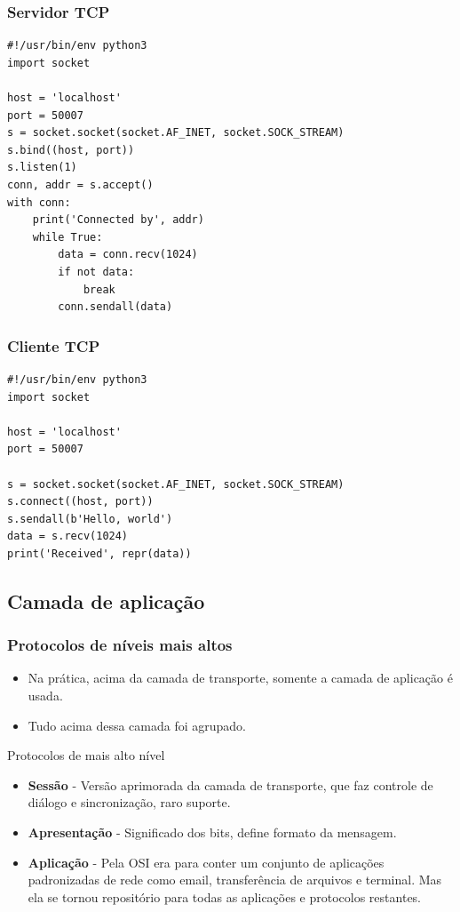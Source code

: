 \documentclass[xcolor=dvipsnames,10pt,compress,aspectratio=169]{beamer}
\begin{document}
\begin{frame}[fragile]
  \frametitle{Servidor TCP}
\begin{lstlisting}
#!/usr/bin/env python3
import socket

host = 'localhost'
port = 50007
s = socket.socket(socket.AF_INET, socket.SOCK_STREAM)
s.bind((host, port))
s.listen(1)
conn, addr = s.accept()
with conn:
    print('Connected by', addr)
    while True:
        data = conn.recv(1024)
        if not data:
            break
        conn.sendall(data)
\end{lstlisting}
\end{frame}

\begin{frame}[fragile]
  \frametitle{Cliente TCP}
\begin{lstlisting}
#!/usr/bin/env python3
import socket

host = 'localhost'
port = 50007

s = socket.socket(socket.AF_INET, socket.SOCK_STREAM)
s.connect((host, port))
s.sendall(b'Hello, world')
data = s.recv(1024)
print('Received', repr(data))
\end{lstlisting}
\end{frame}

\subsection{Camada de aplicação}

\begin{frame}
  \frametitle{Protocolos de níveis mais altos}
  \begin{itemize}
  \item Na prática, acima da camada de transporte, somente a camada de aplicação é usada.
  \item Tudo acima dessa camada foi agrupado.
  \end{itemize}
  \begin{block}{Protocolos de mais alto nível}
    \begin{itemize}
    \item \textbf{Sessão} -  Versão aprimorada da camada de transporte, que faz
      controle de diálogo e sincronização, raro suporte.
    \item \textbf{Apresentação} - Significado dos bits, define formato da mensagem.
    \item \textbf{Aplicação} - Pela  OSI era para conter um conjunto de aplicações padronizadas
      de rede como email, transferência de arquivos e terminal. Mas ela se tornou repositório
      para todas as aplicações e protocolos restantes.
    \end{itemize}
  \end{block}
\end{frame}
\end{document}
